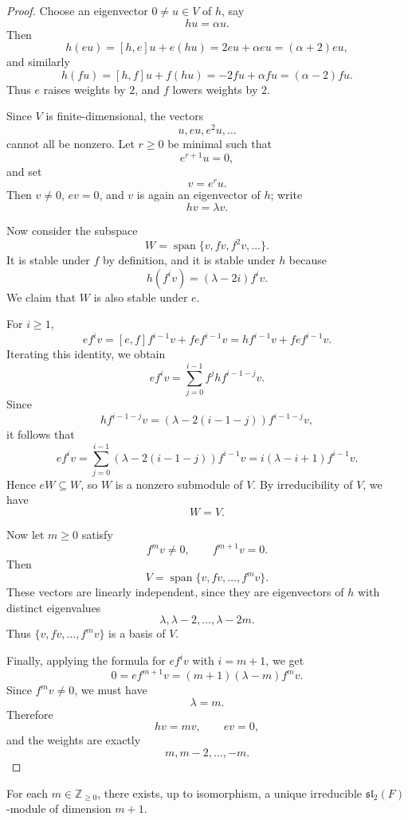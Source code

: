 \begin{proof}
    Choose an eigenvector \(0\neq u\in V\) of \(h\), say
    \[
        hu=\alpha u.
    \]
    Then
    \[
        h(eu)=[h,e]u+e(hu)=2eu+\alpha eu=(\alpha+2)eu,
    \]
    and similarly
    \[
        h(fu)=[h,f]u+f(hu)=-2fu+\alpha fu=(\alpha-2)fu.
    \]
    Thus \(e\) raises weights by \(2\), and \(f\) lowers weights by \(2\).

    Since \(V\) is finite-dimensional, the vectors
    \[
        u,eu,e^2u,\dots
    \]
    cannot all be nonzero. Let \(r\ge 0\) be minimal such that
    \[
        e^{r+1}u=0,
    \]
    and set
    \[
        v=e^ru.
    \]
    Then \(v\neq 0\), \(ev=0\), and \(v\) is again an eigenvector of \(h\); write
    \[
        hv=\lambda v.
    \]

    Now consider the subspace
    \[
        W=\operatorname{span}\{v,fv,f^2v,\dots\}.
    \]
    It is stable under \(f\) by definition, and it is stable under \(h\) because
    \[
        h(f^iv)=(\lambda-2i)f^iv.
    \]
    We claim that \(W\) is also stable under \(e\).

    For \(i\ge 1\),
    \[
        ef^iv=[e,f]f^{i-1}v+fef^{i-1}v
        =hf^{i-1}v+fef^{i-1}v.
    \]
    Iterating this identity, we obtain
    \[
        ef^iv=\sum_{j=0}^{i-1}f^jhf^{i-1-j}v.
    \]
    Since
    \[
        hf^{i-1-j}v=(\lambda-2(i-1-j))f^{i-1-j}v,
    \]
    it follows that
    \[
        ef^iv=\sum_{j=0}^{i-1}(\lambda-2(i-1-j))f^{i-1}v
        =i(\lambda-i+1)f^{i-1}v.
    \]
    Hence \(eW\subseteq W\), so \(W\) is a nonzero submodule of \(V\). By irreducibility of \(V\), we have
    \[
        W=V.
    \]

    Now let \(m\ge 0\) satisfy
    \[
        f^mv\neq 0,\qquad f^{m+1}v=0.
    \]
    Then
    \[
        V=\operatorname{span}\{v,fv,\dots,f^mv\}.
    \]
    These vectors are linearly independent, since they are eigenvectors of \(h\) with distinct eigenvalues
    \[
        \lambda,\lambda-2,\dots,\lambda-2m.
    \]
    Thus \(\{v,fv,\dots,f^mv\}\) is a basis of \(V\).

    Finally, applying the formula for \(ef^iv\) with \(i=m+1\), we get
    \[
        0=ef^{m+1}v=(m+1)(\lambda-m)f^mv.
    \]
    Since \(f^mv\neq 0\), we must have
    \[
        \lambda=m.
    \]
    Therefore
    \[
        hv=mv,\qquad ev=0,
    \]
    and the weights are exactly
    \[
        m,m-2,\dots,-m.
    \]
\end{proof}

\begin{corollary}\label{cor:sl2-unique}
    For each \(m\in\mathbb Z_{\ge 0}\), there exists, up to isomorphism, a unique irreducible \(\mathfrak{sl}_2(F)\)-module of dimension \(m+1\).
\end{corollary}


